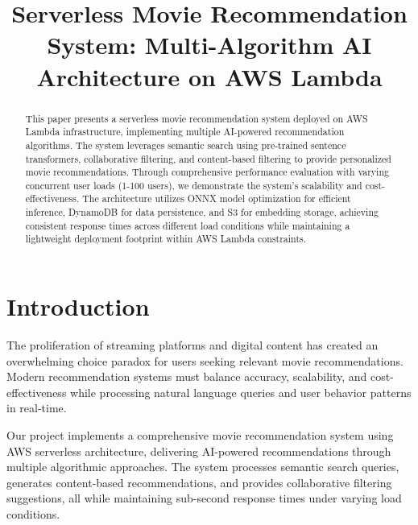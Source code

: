 \documentclass[conference]{IEEEtran}
\begin{document}
\title{Serverless Movie Recommendation System: Multi-Algorithm AI Architecture on AWS Lambda}

\author{
\and
{}
}

\maketitle

\begin{abstract}
This paper presents a serverless movie recommendation system deployed on AWS Lambda infrastructure, implementing multiple AI-powered recommendation algorithms. The system leverages semantic search using pre-trained sentence transformers, collaborative filtering, and content-based filtering to provide personalized movie recommendations. Through comprehensive performance evaluation with varying concurrent user loads (1-100 users), we demonstrate the system's scalability and cost-effectiveness. The architecture utilizes ONNX model optimization for efficient inference, DynamoDB for data persistence, and S3 for embedding storage, achieving consistent response times across different load conditions while maintaining a lightweight deployment footprint within AWS Lambda constraints.
\end{abstract}

\section{Introduction}

The proliferation of streaming platforms and digital content has created an overwhelming choice paradox for users seeking relevant movie recommendations. Modern recommendation systems must balance accuracy, scalability, and cost-effectiveness while processing natural language queries and user behavior patterns in real-time.

Our project implements a comprehensive movie recommendation system using AWS serverless architecture, delivering AI-powered recommendations through multiple algorithmic approaches. The system processes semantic search queries, generates content-based recommendations, and provides collaborative filtering suggestions, all while maintaining sub-second response times under varying load conditions.
\end{document}
